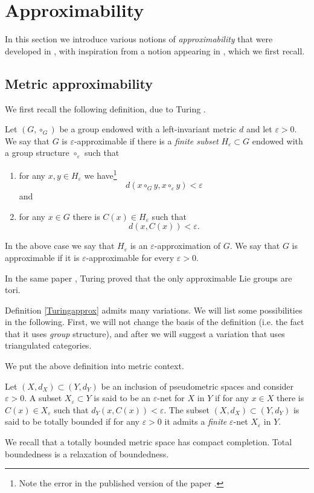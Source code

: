 

\section{Approximability}\label{se:approx}
In this section we introduce various notions of \textit{approximability} that were developed in \cite{ABC26}, with inspiration from a notion appearing in \cite{Turing:approx}, which we first recall.

\subsection{Metric approximability}\label{se:Turing}
We first recall the following definition, due to Turing \cite{Turing:approx}.
\begin{dfn}\label{Turingapprox}
    Let $(G,\circ_G)$ be a group endowed with a left-invariant metric $d$ and let $\varepsilon>0$. We say that $G$ is $\varepsilon$-approximable if there is a \textit{finite subset} $H_\varepsilon \subset G$ endowed with a group structure $\circ_\varepsilon$ such that \begin{enumerate}
        \item for any $x,y\in H_\varepsilon$ we have\footnote{Note the error in the published version of the paper \cite{Turing:approx}.} $$d(x\circ_G y, x\circ_\varepsilon y)<\varepsilon$$ and
        \item for any $x\in G$ there is $C(x)\in H_\varepsilon$ such that $$d(x,C(x))<\varepsilon.$$
    \end{enumerate}
    In the above case we say that $H_\varepsilon$ is an $\varepsilon$-approximation of $G$. We say that $G$ is approximable if it is $\varepsilon$-approximable for every $\varepsilon>0$.
\end{dfn}
\noindent In the same paper \cite{Turing:approx}, Turing proved that the only approximable Lie groups are tori.

Definition \ref{Turingapprox} admits many variations. We will list some possibilities in the following. First, we will not change the basis of the definition (i.e. the fact that it uses \textit{group} structure), and after we will suggest a variation that uses triangulated categories.


We put the above definition into metric context. 
\begin{dfn}
Let $(X,d_X)\subset (Y,d_Y)$ be an inclusion of pseudometric spaces and consider $\varepsilon>0$. A subset $X_\varepsilon\subset Y$ is said to be an $\varepsilon$-net for $X$ in $Y$ if for any $x\in X$ there is $C(x)\in X_\varepsilon$ such that $d_Y(x,C(x))<\varepsilon$. The subset $(X,d_X)\subset (Y,d_Y)$ is said to be totally bounded if for any $\varepsilon>0$ it admits a \textit{finite} $\varepsilon$-net $X_\varepsilon$ in $Y$.
\end{dfn} We recall that a totally bounded metric space has compact completion. Total boundedness is a relaxation of boundedness.

